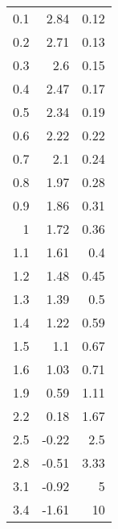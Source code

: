 \begin{tabular}{rrr}
\hline
 0.1 &  2.84 &  0.12 \\
 0.2 &  2.71 &  0.13 \\
 0.3 &  2.6  &  0.15 \\
 0.4 &  2.47 &  0.17 \\
 0.5 &  2.34 &  0.19 \\
 0.6 &  2.22 &  0.22 \\
 0.7 &  2.1  &  0.24 \\
 0.8 &  1.97 &  0.28 \\
 0.9 &  1.86 &  0.31 \\
 1   &  1.72 &  0.36 \\
 1.1 &  1.61 &  0.4  \\
 1.2 &  1.48 &  0.45 \\
 1.3 &  1.39 &  0.5  \\
 1.4 &  1.22 &  0.59 \\
 1.5 &  1.1  &  0.67 \\
 1.6 &  1.03 &  0.71 \\
 1.9 &  0.59 &  1.11 \\
 2.2 &  0.18 &  1.67 \\
 2.5 & -0.22 &  2.5  \\
 2.8 & -0.51 &  3.33 \\
 3.1 & -0.92 &  5    \\
 3.4 & -1.61 & 10    \\
\hline
\end{tabular}